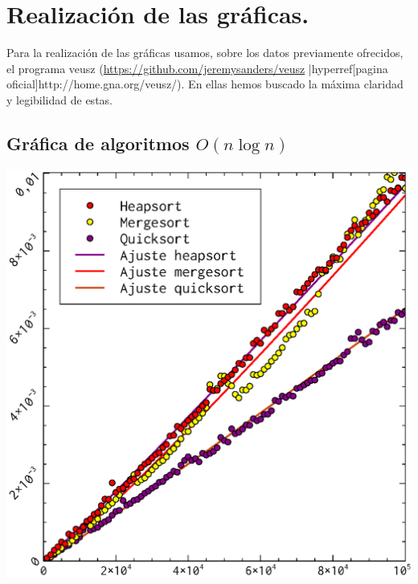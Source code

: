 \documentclass[a4paper, 11pt]{article}
\begin{document}
\section{Realización de las gráficas.}
Para la realización de las gráficas usamos, sobre los datos previamente ofrecidos, el programa veusz (\hyperref[github]{https://github.com/jeremysanders/veusz} |hyperref[pagina oficial]{http://home.gna.org/veusz/}). En  ellas hemos buscado la máxima claridad y legibilidad de estas.

\subsection{Gráfica de algoritmos $O(n\log n)$}
  \includegraphics[]{nlogn_ajuste.eps}
\end{document}
